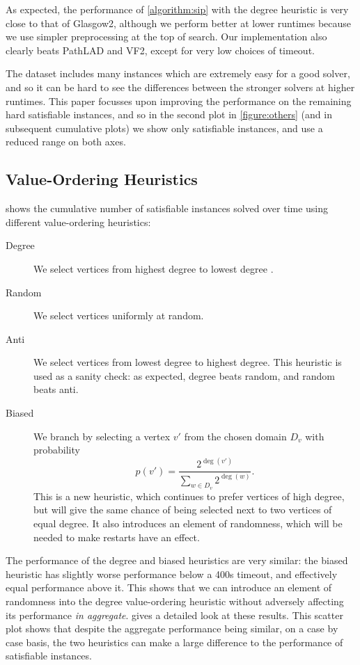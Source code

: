 \documentclass[letterpaper]{article} %
\begin{document}
As expected, the performance of \cref{algorithm:sip} with the degree heuristic is very close to that
of Glasgow2, although we perform better at lower runtimes because we use simpler preprocessing at
the top of search. Our implementation also clearly beats PathLAD and VF2, except for very low
choices of timeout.

The dataset includes many instances which are extremely easy for a good solver, and so it can be
hard to see the differences between the stronger solvers at higher runtimes. This paper focusses
upon improving the performance on the remaining hard satisfiable instances, and so in the second
plot in \cref{figure:others} (and in subsequent cumulative plots) we show only satisfiable
instances, and use a reduced range on both axes.

\subsection{Value-Ordering Heuristics}

 shows the cumulative number of satisfiable instances
solved over time using different value-ordering heuristics:

\begin{description}
\item[Degree] We select vertices from highest degree to lowest degree
\cite{DBLP:conf/ijcai/McCreeshPT16}.

\item[Random] We select vertices uniformly at random.

\item[Anti] We select vertices from lowest degree to highest degree. This heuristic is used as
a sanity check: as expected, degree beats random, and random beats anti.

\item[Biased] We branch by selecting a vertex $v'$ from the chosen domain $D_v$ with
probability \[ p(v') = \frac{2^{\deg(v')}}{\sum_{w \in D_v}{2^{\deg(w)}}} \text{.} \] This is a new
heuristic, which continues to prefer vertices of high degree, but will give the same chance of
being selected next to two vertices of equal degree.  It also introduces an element of randomness,
which will be needed to make restarts have an effect. \end{description}

\noindent
The performance of the degree and biased heuristics are very similar: the
biased heuristic has slightly worse performance below a 400s timeout, and effectively equal
performance above it. This shows that we can introduce an element of randomness into the degree
value-ordering heuristic without adversely affecting its performance \emph{in aggregate}.
 gives a detailed look at these results. This scatter plot
shows that despite the aggregate performance being similar, on a case by case basis, the two
heuristics can make a large difference to the performance of satisfiable instances.
\end{document}
